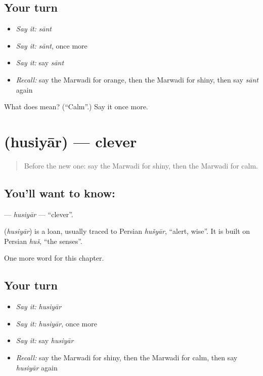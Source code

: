 \subsection*{Your turn}
\begin{itemize}
\raggedright
  \item \emph{Say it:} \emph{sānt}
  \item \emph{Say it:} \emph{sānt}, once more
  \item \emph{Say it:} say \emph{sānt}
  \item \emph{Recall:} say the Marwadi for orange, then the Marwadi for shiny, then say \emph{sānt} again
\end{itemize}

\begin{tcolorbox}[breakable,colback=teal!4,colframe=teal!35!black,title={Before you move on}]
What does  mean? (\textquotedblleft{}Calm\textquotedblright{}.) Say it once more.
\end{tcolorbox}
\section[\texorpdfstring{\mw{हुसियार} (husiyār)}{हुसियार (husiyār)}]{ (husiyār) — clever}

\label{lesson:MW-C146-husiyar}



\begin{quote}
Before the new one: say the Marwadi for shiny, then the Marwadi for calm.
\end{quote}

\subsection*{You'll want to know: }
\textbf{} — \emph{husiyār} — \textquotedblleft{}clever\textquotedblright{}.

\begin{cousinweb}
\textbf{} (\emph{husiyār}) is a loan, usually traced to Persian \emph{hušyār}, \textquotedblleft{}alert, wise\textquotedblright{}. It is built on Persian \emph{huš}, \textquotedblleft{}the senses\textquotedblright{}.
\end{cousinweb}

\begin{grammarlens}[title={What you've built}]
One more word for this chapter.
\end{grammarlens}

\subsection*{Your turn}
\begin{itemize}
\raggedright
  \item \emph{Say it:} \emph{husiyār}
  \item \emph{Say it:} \emph{husiyār}, once more
  \item \emph{Say it:} say \emph{husiyār}
  \item \emph{Recall:} say the Marwadi for shiny, then the Marwadi for calm, then say \emph{husiyār} again
\end{itemize}

